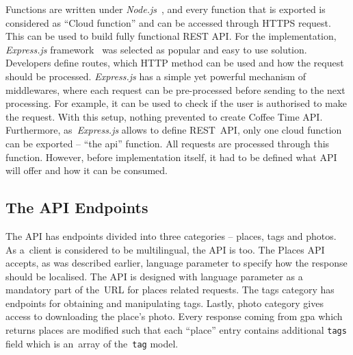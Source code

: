 Functions are written under \textit{Node.js}~\cite{node-js}, and every function that is exported is considered as ``Cloud function'' and can be accessed through HTTPS request. This can be used to build fully functional REST API. For the implementation, \textit{Express.js} framework~\cite{express-js} was selected as popular and easy to use solution. Developers define routes, which HTTP method can be used and how the request should be processed. 
\textit{Express.js} has a simple yet powerful mechanism of middlewares, where each request can be pre-processed before sending to the next processing. For example, it can be used to check if the user is authorised to make the request. With this setup, nothing prevented to create Coffee Time API. Furthermore, as~\textit{Express.js} allows to define REST~API, only one cloud function can be exported -- ``the api'' function. All requests are processed through this function. However, before implementation itself, it had to be defined what API will offer and how it can be consumed. 
\subsection{The API Endpoints}
The API has endpoints divided into three categories -- places, tags and photos. As a~client is considered to be multilingual, the API is too. The Places API accepts, as was described earlier, language parameter to specify how the response should be localised. The API is designed with language parameter as a mandatory part of the~URL for places related requests. The tags category has endpoints for obtaining and manipulating tags. Lastly, photo category gives access to downloading the place's photo. Every response coming from \gls{gpa} which returns places are modified such that each ``place'' entry contains additional \verb|tags| field which is an~array of the~\verb|tag| model. 

